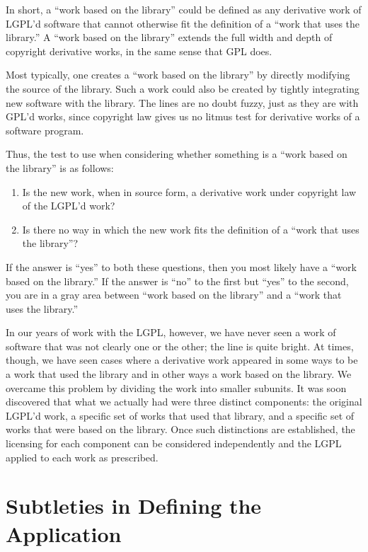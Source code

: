 In short, a ``work based on the library'' could be defined as any
derivative work of LGPL'd software that cannot otherwise fit the
definition of a ``work that uses the library.''  A ``work based on the
library'' extends the full width and depth of copyright derivative works,
in the same sense that GPL does.

Most typically, one creates a ``work based on the library'' by directly
modifying the source of the library. Such a work could also be created by
tightly integrating new software with the library. The lines are no doubt
fuzzy, just as they are with GPL'd works, since copyright law gives us no
litmus test for derivative works of a software program.

Thus, the test to use when considering whether something is a ``work
based on the library'' is as follows:

\begin{enumerate}

\item Is the new work, when in source form, a derivative work under
  copyright law of the LGPL'd work?

\item Is there no way in which the new work fits the definition of a
  ``work that uses the library''?
\end{enumerate}


If the answer is ``yes'' to both these questions, then you most likely
have a ``work based on the library.''  If the answer is ``no'' to the
first but ``yes'' to the second, you are in a gray area between ``work
based on the library'' and a ``work that uses the library.''

In our years of work with the LGPL, however, we have never seen a work
of software that was not clearly one or the other; the line is quite
bright. At times, though, we have seen cases where a derivative work
appeared in some ways to be a work that used the library and in other
ways a work based on the library. We overcame this problem by
dividing the work into smaller subunits. It was soon discovered that
what we actually had were three distinct components: the original
LGPL'd work, a specific set of works that used that library, and a
specific set of works that were based on the library. Once such
distinctions are established, the licensing for each component can be
considered independently and the LGPL applied to each work as
prescribed.


\section{Subtleties in Defining the Application}

